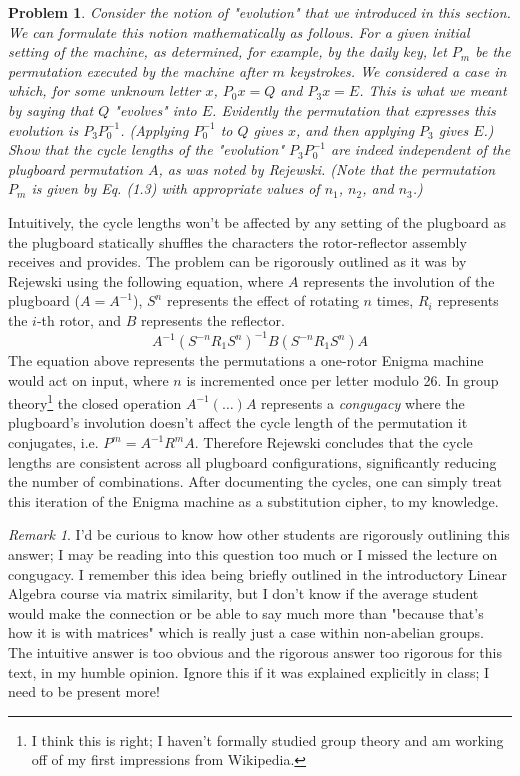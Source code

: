 \documentclass[12pt]{article}
\newenvironment{answer}
    {\begin{adjustwidth}{0pt}{0pt}}
    {\end{adjustwidth}}
\newtheorem{problem}{Problem}
\theoremstyle{remark}  %
\newtheorem*{remark}{Remark}
\begin{document}
    \setcounter{problem}{3}
    \begin{problem}
        Consider the notion of "evolution" that we introduced in this section. We can formulate this notion mathematically as follows. For a given initial setting of the machine, as determined, for example, by the daily key, let $P_m$ be the permutation executed by the machine after $m$ keystrokes. We considered a case in which, for some unknown letter $x$, $P_0x=Q$ and $P_3x=E$. This is what we meant by saying that $Q$ "evolves" into $E$. Evidently the permutation that expresses this evolution is $P_3P_0^{-1}$. (Applying $P_0^{-1}$ to $Q$ gives $x$, and then applying $P_3$ gives $E$.) Show that the cycle lengths of the "evolution" $P_3P_0^{-1}$ are indeed independent of the plugboard permutation $A$, as was noted by Rejewski. (Note that the permutation $P_m$ is given by Eq. (1.3) with appropriate values of $n_1$, $n_2$, and $n_3$.)
    \end{problem}
    \begin{answer}
        Intuitively, the cycle lengths won't be affected by any setting of the plugboard as the plugboard statically shuffles the characters the rotor-reflector assembly receives and provides. The problem can be rigorously outlined as it was by Rejewski using the following equation, where $A$ represents the involution of the plugboard ($A=A^{-1}$), $S^n$ represents the effect of rotating $n$ times, $R_i$ represents the $i$-th rotor, and $B$ represents the reflector. $$A^{-1} (S^{-n}R_1S^{n})^{-1} B (S^{-n}R_1 S^{n})A$$ The equation above represents the permutations a one-rotor Enigma machine would act on input, where $n$ is incremented once per letter modulo 26. In group theory\footnote{I think this is right; I haven't formally studied group theory and am working off of my first impressions from Wikipedia.} the closed operation $A^{-1}(\dots)A$ represents a \emph{congugacy} where the plugboard's involution doesn't affect the cycle length of the permutation it conjugates, i.e. $P^m=A^{-1}R^mA$. Therefore Rejewski concludes that the cycle lengths are consistent across all plugboard configurations, significantly reducing the number of combinations. After documenting the cycles, one can simply treat this iteration of the Enigma machine as a substitution cipher, to my knowledge.
    \end{answer}
    \begin{remark}
        I'd be curious to know how other students are rigorously outlining this answer; I may be reading into this question too much or I missed the lecture on congugacy. I remember this idea being briefly outlined in the introductory Linear Algebra course via matrix similarity, but I don't know if the average student would make the connection or be able to say much more than "because that's how it is with matrices" which is really just a case within non-abelian groups. The intuitive answer is too obvious and the rigorous answer too rigorous for this text, in my humble opinion. Ignore this if it was explained explicitly in class; I need to be present more!
    \end{remark}
\end{document}
